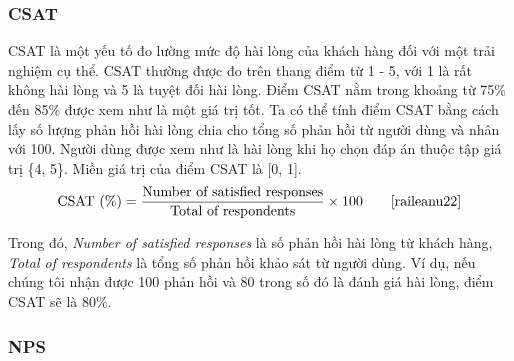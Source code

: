 \subsubsection{CSAT}

CSAT là một yếu tố đo lường mức độ hài lòng của khách hàng đối với một trải nghiệm cụ thể. CSAT thường được đo trên thang điểm từ 1 - 5, với 1 là rất không hài lòng và 5 là tuyệt đối hài lòng. Điểm CSAT nằm trong khoảng từ 75\% đến 85\% được xem như là một giá trị tốt. Ta có thể tính điểm CSAT bằng cách lấy số lượng phản hồi hài lòng chia cho tổng số phản hồi từ người dùng và nhân với 100. Người dùng được xem như là hài lòng khi họ chọn đáp án thuộc tập giá trị \{4, 5\}. Miền giá trị của điểm CSAT là [0, 1].
\[ \text{CSAT (\%)} = \frac{\text{Number of satisfied responses}}{\text{Total of respondents}} \times 100 \tag*{\cite{raileanu22}}\]
\par
Trong đó, \emph{Number of satisfied responses} là số phản hồi hài lòng từ khách hàng, \emph{Total of respondents} là tổng số phản hồi khảo sát từ người dùng. Ví dụ, nếu chúng tôi nhận được 100 phản hồi và 80 trong số đó là đánh giá hài lòng, điểm CSAT sẽ là 80\%.

\subsubsection{NPS}

